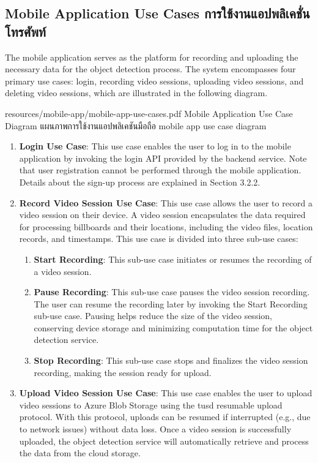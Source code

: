 \subsection{\ifenglish Mobile Application Use Cases \else การใช้งานแอปพลิเคชั่นโทรศัพท์ \fi}
The mobile application serves as the platform for recording and uploading the necessary data for the object detection process. The system encompasses four primary use cases: login, recording video sessions, uploading video sessions, and deleting video sessions, which are illustrated in the following diagram.

\insertPDFfigure
{resources/mobile-app/mobile-app-use-cases.pdf}
{\ifenglish Mobile Application Use Case Diagram \else แผนภาพการใช้งานแอปพลิเคชันมือถือ\fi}
{mobile app use case diagram}

\begin{enumerate}
    \item \textbf{Login Use Case}: This use case enables the user to log in to the mobile application by invoking the login API provided by the backend service. Note that user registration cannot be performed through the mobile application. Details about the sign-up process are explained in Section 3.2.2. %
    \item \textbf{Record Video Session Use Case}: This use case allows the user to record a video session on their device. A video session encapsulates the data required for processing billboards and their locations, including the video files, location records, and timestamps. This use case is divided into three sub-use cases:  
    \begin{enumerate}
        \item \textbf{Start Recording}: This sub-use case initiates or resumes the recording of a video session.  
        \item \textbf{Pause Recording}: This sub-use case pauses the video session recording. The user can resume the recording later by invoking the Start Recording sub-use case. Pausing helps reduce the size of the video session, conserving device storage and minimizing computation time for the object detection service.  
        \item \textbf{Stop Recording}: This sub-use case stops and finalizes the video session recording, making the session ready for upload.  
    \end{enumerate}
    \item \textbf{Upload Video Session Use Case}: This use case enables the user to upload video sessions to Azure Blob Storage using the tusd resumable upload protocol. With this protocol, uploads can be resumed if interrupted (e.g., due to network issues) without data loss. Once a video session is successfully uploaded, the object detection service will automatically retrieve and process the data from the cloud storage.  

\end{enumerate}
